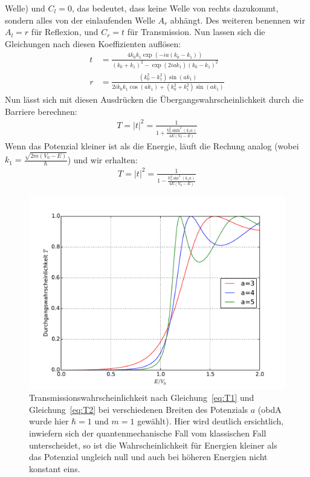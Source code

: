 Welle) und $C_l = 0$, das bedeutet, dass keine Welle von rechts dazukommt,
sondern alles von der einlaufenden Welle $A_r$ abhängt. Des weiteren
benennen wir $A_l=r$ für Reflexion, und $C_r=t$ für Transmission. Nun
lassen sich die Gleichungen nach diesen Koeffizienten auflösen:
\begin{align}
    t &= \frac{4k_0k_1\exp(-ia(k_0-k_1))}{(k_0+k_1)^2 - \exp(2iak_1)(k_0-k_1)^2}\\
    r &= \frac{(k_0^2 - k_1^2)\sin(ak_1)}{2ik_0k_1\cos(ak_1)+(k_0^2+k_1^2)\sin(ak_1)}
\end{align}
Nun lässt sich mit diesen Ausdrücken die Übergangswahrscheinlichkeit durch die 
Barriere berechnen:
\begin{align}
    T = \left | t \right |^2 = \frac{1}{1 + \frac{V_0^2 \sinh^2(k_1a)}{4E(V_0-E)}}
    \label{eq:T1}
\end{align}
Wenn das Potenzial kleiner ist als die Energie, läuft die Rechung analog
(wobei $k_1 = \frac{\sqrt{2m(V_0-E)}}{\hbar}$) und wir erhalten:
\begin{align}
    T = \left | t \right |^2 = \frac{1}{1 - \frac{V_0^2 \sin^2(k_1a)}{4E(V_0-E)}}
    \label{eq:T2}
\end{align}

\begin{figure}

\includegraphics[width=14cm]{pics/tunnel1}
\caption{Transmissionswahrscheinlichkeit nach Gleichung~\ref{eq:T1} und Gleichung~\ref{eq:T2}
bei verschiedenen Breiten des Potenzials $a$ (obdA wurde hier $\hbar=1$ und $m=1$ gewählt).
Hier wird deutlich ersichtlich, inwiefern sich der quantenmechanische Fall vom klassischen
Fall unterscheidet, so ist die Wahrscheinlichkeit für Energien kleiner als das Potenzial ungleich
null und auch bei höheren Energien nicht konstant eins.} 

 \label{fig:tunnel1}
\end{figure}

